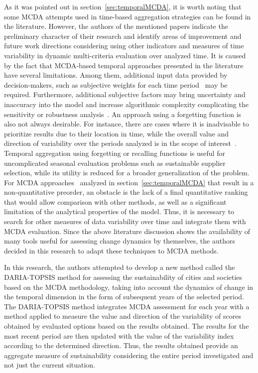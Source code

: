 \documentclass[final,5p,times,twocolumn,authoryear]{elsarticle}
\begin{document}
As it was pointed out in section~\ref{sec:temporalMCDA}, it is worth noting that some MCDA attempts used in time-based aggregation strategies can be found in the literature. However, the authors of the mentioned papers indicate the preliminary character of their research and identify areas of improvement and future work directions considering using other indicators and measures of time variability in dynamic multi-criteria evaluation over analyzed time. It is caused by the fact that MCDA-based temporal approaches presented in the literature have several limitations. Among them, additional input data provided by decision-makers, such as subjective weights for each time period~\citep{frini2018making, banamar2018extension, urli2019promethee, frini2019mupom} may be required. Furthermore, additional subjective factors may bring uncertainty and inaccuracy into the model and increase algorithmic complexity complicating the sensitivity or robustness analysis~\citep{urli2019promethee, frini2019mupom}. An approach using a forgetting function is also not always desirable. For instance, there are cases where it is inadvisable to prioritize results due to their location in time, while the overall value and direction of variability over the periods analyzed is in the scope of interest~\citep{watrobski2016multistage, karczmarczyk2018comparative, kizielewicz2021study}. Temporal aggregation using forgetting or recalling functions is useful for uncomplicated seasonal evaluation problems such as sustainable supplier selection, while its utility is reduced for a broader generalization of the problem. For MCDA approaches~\citep{frini2020temporal, mouhib2021tsmaa, khalili2013application} analyzed in section~\ref{sec:temporalMCDA} that result in a non-quantitative preorder, an obstacle is the lack of a final quantitative ranking that would allow comparison with other methods, as well as a significant limitation of the analytical properties of the model. Thus, it is necessary to search for other measures of data variability over time and integrate them with MCDA evaluation. Since the above literature discussion shows the availability of many tools useful for assessing change dynamics by themselves, the authors decided in this research to adapt these techniques to MCDA methods.

In this research, the authors attempted to develop a new method called the DARIA-TOPSIS method for assessing the sustainability of cities and societies based on the MCDA methodology, taking into account the dynamics of change in the temporal dimension in the form of subsequent years of the selected period. The DARIA-TOPSIS method integrates MCDA assessment for each year with a method applied to measure the value and direction of the variability of scores obtained by evaluated options based on the results obtained. The results for the most recent period are then updated with the value of the variability index according to the determined direction. Thus, the results obtained provide an aggregate measure of sustainability considering the entire period investigated and not just the current situation.
\end{document}
